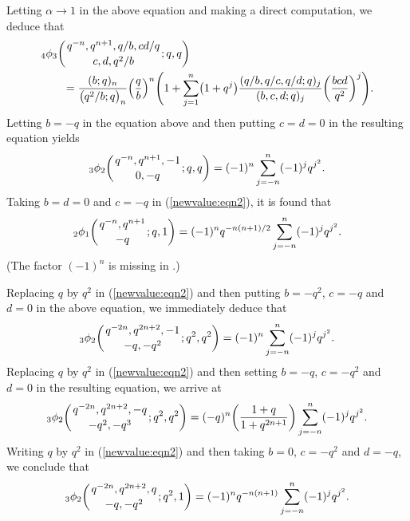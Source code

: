 \documentclass[pdftex]{sigma}
\numberwithin{equation}{section}
\begin{document}
Letting $\alpha \to 1$ in the above equation and making a direct computation, we deduce that
\begin{align}\label{newvalue:eqn2}
	&{_4\phi_3}\biggl({{q^{-n}, q^{n+1}, q/b, cd/q }\atop{c, d, q^2/b}}; q, q\biggr)\\
	&\qquad{}=\frac{(b; q)_n} {\bigl(q^2/b; q\bigr)_n } \Bigl(\frac{q} {b}\Bigr)^n
	\Biggl(1+\sum_{j=1}^n \bigl(1+q^{j}\bigr)\frac{(q/b, q/c, q/d; q)_j}
	{(b, c, d; q)_j}\biggl(\frac{ bcd}{q^2}\biggr)^{j}\Biggr).\nonumber
\end{align}
Letting $b=-q$ in the equation above and then putting $c=d=0$ in the resulting equation yields%
\begin{equation}\label{newvalue:eqn3}
{_3\phi_2}\biggl({{q^{-n}, q^{n+1}, -1}\atop{0, -q}}; q, q\biggr)
=(-1)^n \sum_{j=-n}^n (-1)^j q^{j^2}.
\end{equation}
Taking $b=d=0$ and $c=-q$ in (\ref{newvalue:eqn2}), it is found that \cite[p.~2088]{Liu2013IJTN}
\begin{equation}\label{newvalue:eqn4}
{_2\phi_1}\biggl({{q^{-n}, q^{n+1}}\atop{ -q}}; q, 1\biggr)
=(-1)^n q^{-n(n+1)/2} \sum_{j=-n}^n (-1)^j q^{j^2}.
\end{equation}
(The factor $(-1)^n$ is missing in \cite[Propositions 2.4--2.6 and Theorem~4.10]{Liu2013IJTN}.)

Replacing $q$ by $q^2$ in (\ref{newvalue:eqn2}) and then putting $b=-q^2$, $c=-q$ and $d=0$ in the above equation, we immediately deduce that
\begin{equation}\label{newvalue:eqn5}
{_3\phi_2}\biggl({{q^{-2n}, q^{2n+2}, -1}\atop{-q, -q^2}}; q^2, q^2\biggr)=(-1)^n \sum_{j=-n}^n (-1)^j q^{j^2}.
\end{equation}	
 Replacing $q$ by $q^2$ in (\ref{newvalue:eqn2}) and then setting $b=-q$, $c=-q^2$ and $d=0$ in the resulting equation, we arrive at
 \begin{equation*}%
 	{_3\phi_2}\biggl({{q^{-2n}, q^{2n+2}, -q}\atop{-q^2, -q^3}}; q^2, q^2\biggr)=(-q)^n \biggl(\frac{1+q}{1+q^{2n+1}}\biggr)\sum_{j=-n}^n (-1)^j q^{j^2}.
 \end{equation*}	
Writing $q$ by $q^2$ in (\ref{newvalue:eqn2}) and then
 taking $b=0$, $c=-q^2$ and $d=-q$, we conclude that \mbox{\cite[equa\-tion~(2.7)]{WangYee2019}}
 \begin{equation*}%
 	{_3\phi_2}\biggl({{q^{-2n}, q^{2n+2}, q}\atop{-q, -q^2}}; q^2, 1\biggr)=(-1)^n q^{-n(n+1)}\sum_{j=-n}^n (-1)^j q^{j^2}.
 	\end{equation*}
\end{document}
